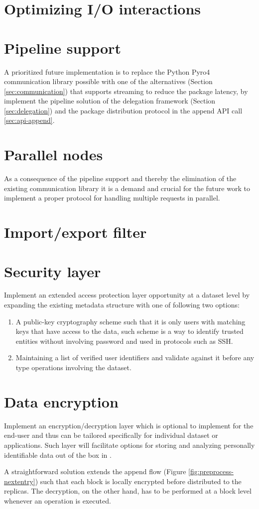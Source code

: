 \section{Optimizing I/O interactions}

\section{Pipeline support}
A prioritized future implementation is to replace the Python Pyro4 communication library possible with one of the alternatives (Section \ref{sec:communication}) that supports streaming to reduce the package latency, by implement the pipeline solution of the delegation framework (Section \ref{sec:delegation}) and the package distribution protocol in the append API call \ref{sec:api-append}.

\section{Parallel nodes}
As a consequence of the pipeline support and thereby the elimination of the existing communication library it is a demand and crucial for the future work to implement a proper protocol for handling multiple requests in parallel.

\section{Import/export filter}

\section{Security layer}
Implement an extended access protection layer opportunity at a dataset level by expanding the existing metadata structure with one of following two options:
\begin{enumerate}
	\item A public-key cryptography scheme such that it is only users with matching keys that have access to the data, such scheme is a way to identify trusted entities without involving password and used in protocols such as SSH.
	\item Maintaining a list of verified user identifiers and validate against it before any type operations involving the dataset.
\end{enumerate}

\section{Data encryption}
Implement an encryption/decryption layer which is optional to implement for the end-user and thus can be tailored specifically for individual dataset or applications. Such layer will facilitate options for storing and analyzing personally identifiable data out of the box in \CodeName. 
\newline

A straightforward solution extends the append flow (Figure \ref{fig:preprocess-nextentry}) such that each block is locally encrypted before distributed to the replicas. The decryption, on the other hand, has to be performed at a block level whenever an operation is executed.
